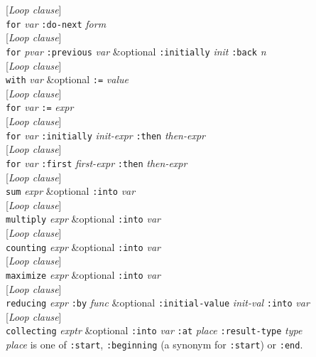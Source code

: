 \documentclass[10pt]{book}
\newenvironment{defother}[2]{[\textit{#1}]\\\texttt{#2}}{\\}
\begin{document}
\begin{defother}{Loop clause}{for} \textit{var} \texttt{:do-next} \textit{form}\end{defother}
\begin{defother}{Loop clause}{for} \textit{pvar} \texttt{:previous} \textit{var} \&optional \texttt{:initially} \textit{init} \texttt{:back} \textit{n}\end{defother}
%
\begin{defother}{Loop clause}{with} \textit{var} \&optional \texttt{:=} \textit{value}\end{defother}
\begin{defother}{Loop clause}{for} \textit{var} \texttt{:=} \textit{expr}\end{defother}
\begin{defother}{Loop clause}{for} \textit{var} \texttt{:initially} \textit{init-expr} \texttt{:then} \textit{then-expr}\end{defother}
\begin{defother}{Loop clause}{for} \textit{var} \texttt{:first} \textit{first-expr} \texttt{:then} \textit{then-expr}\end{defother} %
\begin{defother}{Loop clause}{sum} \textit{expr} \&optional \texttt{:into} \textit{var}\end{defother}
\begin{defother}{Loop clause}{multiply} \textit{expr} \&optional \texttt{:into} \textit{var}\end{defother}
\begin{defother}{Loop clause}{counting} \textit{expr} \&optional \texttt{:into} \textit{var}\end{defother}
\begin{defother}{Loop clause}{maximize} \textit{expr} \&optional \texttt{:into} \textit{var}\end{defother}
\begin{defother}{Loop clause}{reducing} \textit{expr} \texttt{:by} \textit{func} \&optional \texttt{:initial-value} \textit{init-val} \texttt{:into} \textit{var}\end{defother}
\begin{defother}{Loop clause}{collecting} \textit{exptr} \&optional \texttt{:into} \textit{var} \texttt{:at} \textit{place} \texttt{:result-type} \textit{type}\\ \textit{place} is one of \texttt{:start}, \texttt{:beginning} (a synonym for \texttt{:start}) or \texttt{:end}.\end{defother}
\end{document}
